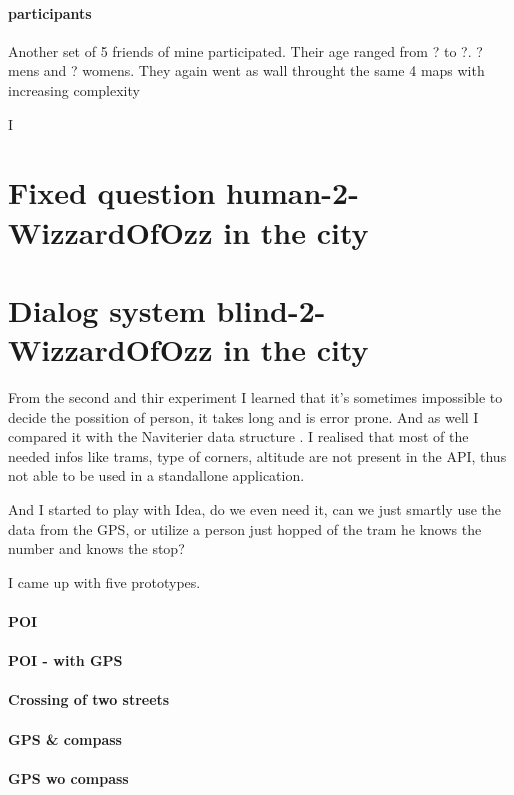 \paragraph{participants}
Another set of 5 friends of mine participated. Their age ranged from ? to ?. ? mens and ? womens. They again went as wall throught the same 4 maps with increasing complexity

	
	 I 
	\section{Fixed question human-2-WizzardOfOzz in the city}
	\section{Dialog system blind-2-WizzardOfOzz in the city}
	From the second and thir experiment I learned that it's sometimes impossible to decide the possition of person, it takes long and is error prone. And as well I compared it with the Naviterier data structure \cite{naviterier-data}. 
	I realised that most of the needed infos like trams, type of corners, altitude are not present in the API, thus not able to be used in a standallone application.
	
	And I started to play with Idea, do we even need it, can we just smartly use the data from the GPS, or utilize a person just hopped of the tram he knows the number and knows the stop?
	
	I came up with five prototypes. 
	
	\paragraph{POI}
	\paragraph{POI - with GPS}
	\paragraph{Crossing of two streets}
	\paragraph{GPS & compass}
	\paragraph{GPS wo compass}
	
